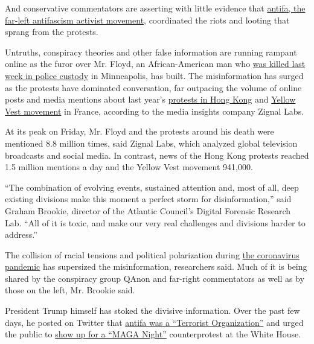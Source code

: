 And conservative commentators are asserting with little evidence that
\href{https://www.nytimes.com/article/what-antifa-trump.html}{antifa,
the far-left antifascism activist movement}, coordinated the riots and
looting that sprang from the protests.

Untruths, conspiracy theories and other false information are running
rampant online as the furor over Mr. Floyd, an African-American man who
\href{https://www.nytimes.com/2020/05/31/us/george-floyd-investigation.html}{was
killed last week in police custody} in Minneapolis, has built. The
misinformation has surged as the protests have dominated conversation,
far outpacing the volume of online posts and media mentions about last
year's
\href{https://www.nytimes.com/news-event/hong-kong-protests}{protests in
Hong Kong} and
\href{https://www.nytimes.com/2019/04/15/business/yellow-vests-movement-inequality.html}{Yellow
Vest movement} in France, according to the media insights company Zignal
Labs.

At its peak on Friday, Mr. Floyd and the protests around his death were
mentioned 8.8 million times, said Zignal Labs, which analyzed global
television broadcasts and social media. In contrast, news of the Hong
Kong protests reached 1.5 million mentions a day and the Yellow Vest
movement 941,000.

``The combination of evolving events, sustained attention and, most of
all, deep existing divisions make this moment a perfect storm for
disinformation,'' said Graham Brookie, director of the Atlantic
Council's Digital Forensic Research Lab. ``All of it is toxic, and make
our very real challenges and divisions harder to address.''

The collision of racial tensions and political polarization during
\href{https://www.nytimes.com/news-event/coronavirus?action=click\&pgtype=Article\&state=default\&module=styln-coronavirus\&variant=show\&region=TOP_BANNER\&context=storylines_menu}{the
coronavirus pandemic} has supersized the misinformation, researchers
said. Much of it is being shared by the conspiracy group QAnon and
far-right commentators as well as by those on the left, Mr. Brookie
said.

President Trump himself has stoked the divisive information. Over the
past few days, he posted on Twitter that
\href{https://www.nytimes.com/reuters/2020/05/31/us/31reuters-minneapolis-police-trump-antifa.html}{antifa
was a ``Terrorist Organization''} and urged the public to
\href{https://www.nytimes.com/2020/05/30/us/politics/trump-threatens-protesters-dogs-weapons.html}{show
up for a ``MAGA Night''} counterprotest at the White House.

